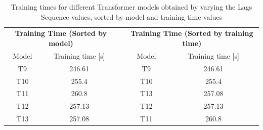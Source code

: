 \begin{table}[]
    \begin{tabular}{ccccc}
    \multicolumn{2}{c}{\cellcolor[HTML]{FFFFFF}\textbf{Training   Time (Sorted by model)}} &  & \multicolumn{2}{c}{\cellcolor[HTML]{FFFFFF}\textbf{Training Time (Sorted   by training time)}} \\
    Model                         & Training time {[}s{]}                                  &  & Model                             & Training time {[}s{]}                                      \\
    T9                            & \cellcolor[HTML]{63BE7B}246.61                         &  & T9                                & \cellcolor[HTML]{63BE7B}246.61                             \\
    T10                           & \cellcolor[HTML]{E5E382}255.4                          &  & T10                               & \cellcolor[HTML]{E5E382}255.4                              \\
    T11                           & \cellcolor[HTML]{F8696B}260.8                          &  & T13                               & \cellcolor[HTML]{FFEB84}257.08                             \\
    T12                           & \cellcolor[HTML]{FFEA84}257.13                         &  & T12                               & \cellcolor[HTML]{FFEA84}257.13                             \\
    T13                           & \cellcolor[HTML]{FFEB84}257.08                         &  & T11                               & \cellcolor[HTML]{F8696B}260.8                             
    \end{tabular}%
    \caption{Training times for different Transformer models obtained  by varying the Lags Sequence values, sorted by model and training time values}
    \label{T2_T}
    \end{table}

